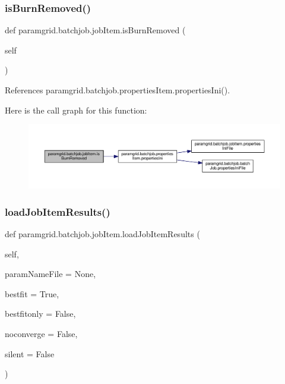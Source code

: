 \subsubsection{\texorpdfstring{is\+Burn\+Removed()}{isBurnRemoved()}}
{\footnotesize\ttfamily def paramgrid.\+batchjob.\+job\+Item.\+is\+Burn\+Removed (\begin{DoxyParamCaption}\item[{}]{self }\end{DoxyParamCaption})}



References paramgrid.\+batchjob.\+properties\+Item.\+properties\+Ini().

Here is the call graph for this function\+:
\nopagebreak
\begin{figure}[H]
\begin{center}
\leavevmode
\includegraphics[width=350pt]{classparamgrid_1_1batchjob_1_1jobItem_a935f89613b4c83962de849b6124f4626_cgraph}
\end{center}
\end{figure}
\mbox{\label{classparamgrid_1_1batchjob_1_1jobItem_aaabde0e3c21736a40d11c0b3df905192}} 
\subsubsection{\texorpdfstring{load\+Job\+Item\+Results()}{loadJobItemResults()}}
{\footnotesize\ttfamily def paramgrid.\+batchjob.\+job\+Item.\+load\+Job\+Item\+Results (\begin{DoxyParamCaption}\item[{}]{self,  }\item[{}]{param\+Name\+File = {\ttfamily None},  }\item[{}]{bestfit = {\ttfamily True},  }\item[{}]{bestfitonly = {\ttfamily False},  }\item[{}]{noconverge = {\ttfamily False},  }\item[{}]{silent = {\ttfamily False} }\end{DoxyParamCaption})}



